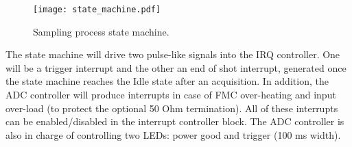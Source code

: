 \documentclass{article}
\begin{document}
\begin{figure}[htbp]
  \centering
  \texttt{[image: state\_machine.pdf]}
  \caption{Sampling process state machine.}
  \label{fig:state_machine}
\end{figure}

The state machine will drive two pulse-like signals into the IRQ controller. One will be a trigger interrupt and the other an end of shot interrupt, generated once the state machine reaches the Idle state after an acquisition. In addition, the ADC controller will produce interrupts in case of FMC over-heating and input over-load (to protect the optional 50 Ohm termination). All of these interrupts can be enabled/disabled in the interrupt controller block. The ADC controller is also in charge of controlling two LEDs: power good and trigger (100 ms width).
\end{document}
